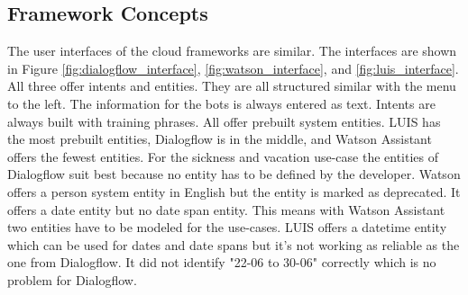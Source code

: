 \subsection*{Framework Concepts}
The user interfaces of the cloud frameworks are similar.
The interfaces are shown in Figure \ref{fig:dialogflow_interface},
\ref{fig:watson_interface}, and \ref{fig:luis_interface}.
All three offer intents and entities.
They are all structured similar with the menu to the left.
The information for the bots is always entered as text.
Intents are always built with training phrases.
All offer prebuilt system entities.
LUIS has the most prebuilt entities, Dialogflow is in the middle,
and Watson Assistant offers the fewest entities.
For the sickness and vacation use-case the entities of 
Dialogflow suit best because no entity has to be defined by 
the developer. 
Watson offers a person system entity in English but the entity
is marked as deprecated.
It offers a date entity but no date span entity.
This means with Watson Assistant two entities have to be 
modeled for the use-cases.
LUIS offers a datetime entity which can be used for dates and 
date spans but it's not working as reliable as the one from 
Dialogflow.
It did not identify "22-06 to 30-06" correctly
which is no problem for Dialogflow.



